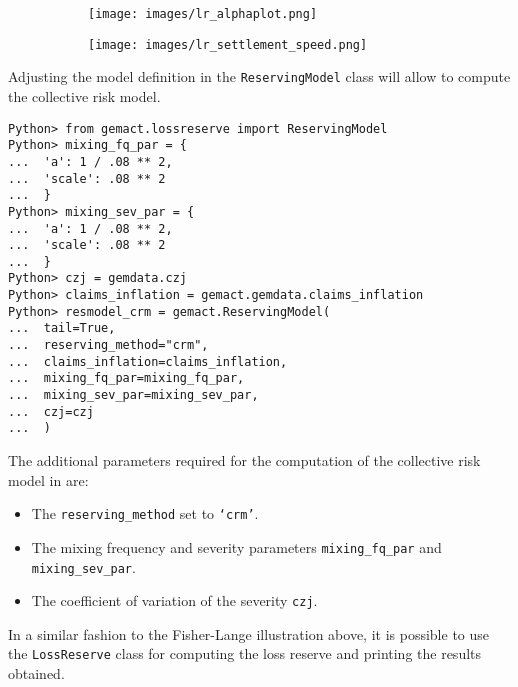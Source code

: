 \documentclass{article}
\begin{document}
\begin{figure}
\centering
\caption{
Illustration of the behavior of the settlement speed by development period. Plot (a) shows Fisher-Lange $\left[\alpha_j\right]_{j=0, \ldots, \mathcal{J}-1}$, Plot (b) displays settlement speed $\left[v^{(i)}_j\right]_{j=0,\ldots, \mathcal{J}-1}$ for $i=0,\ldots, \mathcal{J}-1$.}
\begin{subfigure}[b]{0.45\textwidth}
    \centering\texttt{[image: images/lr\_alphaplot.png]}
    \caption{}
    \label{fig:sspeeda}
\end{subfigure}
\hfill
\begin{subfigure}[b]{0.45\textwidth}
    \centering\texttt{[image: images/lr\_settlement\_speed.png]}
    \caption{}
    \label{fig:sspeedb}
\end{subfigure}
 \label{fig:sspeed}
\end{figure}

Adjusting the model definition in the \texttt{ReservingModel} class will allow to compute the collective risk model.

\begin{lstlisting}
Python> from gemact.lossreserve import ReservingModel
Python> mixing_fq_par = {
...  'a': 1 / .08 ** 2, 
...  'scale': .08 ** 2
...  }
Python> mixing_sev_par = {
...  'a': 1 / .08 ** 2, 
...  'scale': .08 ** 2
...  } 
Python> czj = gemdata.czj
Python> claims_inflation = gemact.gemdata.claims_inflation
Python> resmodel_crm = gemact.ReservingModel(
...  tail=True,
...  reserving_method="crm",
...  claims_inflation=claims_inflation,
...  mixing_fq_par=mixing_fq_par,
...  mixing_sev_par=mixing_sev_par,
...  czj=czj
...  )
\end{lstlisting}

The additional parameters required for the computation of the collective risk model in \cite{ricotta16} are: 

\begin{itemize}
    \item The \texttt{reserving\_method} set to \texttt{`crm'}.
    \item The mixing frequency and severity parameters \texttt{mixing\_fq\_par} and \texttt{mixing\_sev\_par}.
    \item The coefficient of variation of the severity \texttt{czj}.
\end{itemize}

In a similar fashion to the Fisher-Lange illustration above, it is possible to use the \texttt{LossReserve} class for computing the loss reserve and printing the  results obtained.
\clearpage
\end{document}
